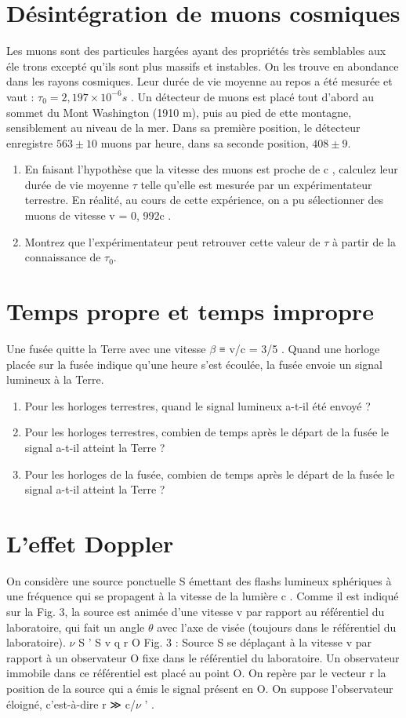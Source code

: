 \section{Désintégration de muons cosmiques}
Les muons sont des particules hargées ayant des propriétés très semblables aux éle trons excepté qu'ils sont plus massifs et instables. On les trouve en abondance dans les rayons cosmiques.
Leur durée de vie moyenne au repos a été mesurée et vaut : $\tau _0 = 2, 197 × 10^{-6} s$ .
Un détecteur de muons est placé tout d'abord au sommet du Mont Washington (1910 m), puis
au pied de ette montagne, sensiblement au niveau de la mer. Dans sa première position, le
détecteur enregistre $563 \pm 10$ muons par heure, dans sa seconde position, $408 \pm 9$.
\begin{enumerate}
  \item En faisant l'hypothèse que la vitesse des muons est proche de c , calculez leur durée de vie
moyenne $\tau$ telle qu'elle est mesurée par un expérimentateur terrestre.
En réalité, au cours de cette expérience, on a pu sélectionner des muons de vitesse v = 0, 992c .
  \item Montrez que l'expérimentateur peut retrouver cette valeur de $\tau$ à partir de la connaissance
de $\tau_0$.
\end{enumerate}
\section{Temps propre et temps impropre}
Une fusée quitte la Terre avec une vitesse $\beta$ ≡ v/c = 3/5 . Quand une horloge placée sur la
fusée indique qu'une heure s'est écoulée, la fusée envoie un signal lumineux à la Terre.
\begin{enumerate}
  \item Pour les horloges terrestres, quand le signal lumineux a-t-il été envoyé ?
  \item Pour les horloges terrestres, combien de temps après le départ de la fusée le signal a-t-il
atteint la Terre ?
  \item Pour les horloges de la fusée, combien de temps après le départ de la fusée le signal a-t-il
atteint la Terre ?
\end{enumerate}
\section{L'effet Doppler}
On considère une source ponctuelle S émettant des flashs lumineux sphériques à une fréquence
qui se propagent à la vitesse de la lumière c . Comme il est indiqué sur la Fig. 3, la source est
animée d'une vitesse v par rapport au référentiel du laboratoire, qui fait un angle $\theta$ avec l'axe
de visée (toujours dans le référentiel du laboratoire).
$\nu$ S '
S
v
q
r
O
Fig. 3 : Source S se déplaçant à la vitesse v par rapport à un observateur O fixe dans le référentiel
du laboratoire.
Un observateur immobile dans ce référentiel est placé au point O. On repère par le vecteur
r la position de la source qui a émis le signal présent en O. On suppose l'observateur éloigné,
c'est-à-dire r ≫ c/$\nu$ ' .
